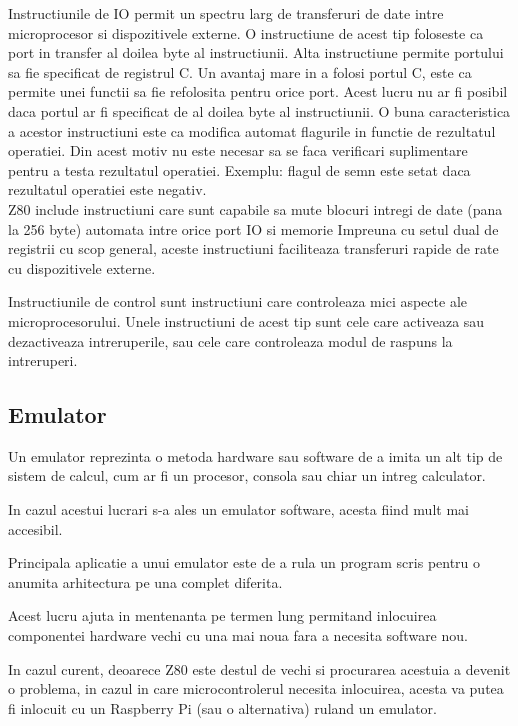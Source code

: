\documentclass[titlepage,12pt]{article}
\begin{document}
Instructiunile de \ac {IO} permit un spectru larg de transferuri de date intre microprocesor si dispozitivele externe.
O instructiune de acest tip foloseste ca port in transfer al doilea byte al instructiunii.
Alta instructiune permite portului sa fie specificat de registrul C.
Un avantaj mare in a folosi portul C, este ca permite unei functii sa fie refolosita pentru orice port.
Acest lucru nu ar fi posibil daca portul ar fi specificat de al doilea byte al instructiunii.
O buna caracteristica a acestor instructiuni este ca modifica automat flagurile in functie de rezultatul operatiei.
Din acest motiv nu este necesar sa se faca verificari suplimentare pentru a testa rezultatul operatiei. Exemplu: flagul de semn este setat daca rezultatul operatiei este negativ.\\

\ac {Z80} include instructiuni care sunt capabile sa mute blocuri intregi de date (pana la 256 byte) automata intre orice port \ac {IO} si memorie
Impreuna cu setul dual de registrii cu scop general, aceste instructiuni faciliteaza transferuri rapide de rate cu dispozitivele externe.

Instructiunile de control sunt instructiuni care controleaza mici aspecte ale microprocesorului.
Unele instructiuni de acest tip sunt cele care activeaza sau dezactiveaza intreruperile, sau cele care controleaza modul de raspuns la intreruperi.

\subsection{Emulator}
Un emulator reprezinta o metoda hardware sau software de a imita un alt tip de sistem de calcul, cum ar fi un procesor, consola sau chiar un intreg calculator.

In cazul acestui lucrari s-a ales un emulator software, acesta fiind mult mai accesibil.

Principala aplicatie a unui emulator este de a rula un program scris pentru o anumita arhitectura pe una complet diferita.

Acest lucru ajuta in mentenanta pe termen lung permitand inlocuirea componentei hardware vechi cu una mai noua fara a necesita software nou.

In cazul curent, deoarece \ac {Z80} este destul de vechi si procurarea acestuia a devenit o problema, in cazul in care microcontrolerul necesita inlocuirea, acesta va putea fi inlocuit cu un Raspberry Pi (sau o alternativa) ruland un emulator.
\end{document}
